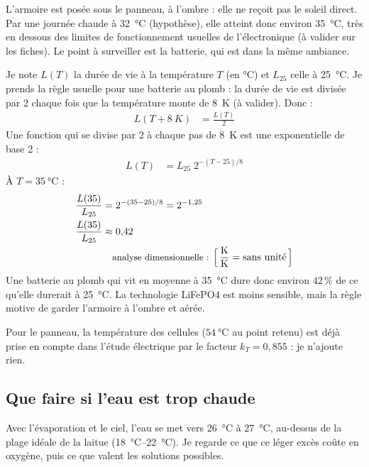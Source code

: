 L'armoire est posée sous le panneau, à l'ombre : elle ne reçoit pas le soleil direct. Par une journée chaude à \qty{32}{\celsius} (hypothèse), elle atteint donc environ \qty{35}{\celsius}, très en dessous des limites de fonctionnement usuelles de l'électronique (à valider sur les fiches). Le point à surveiller est la batterie, qui est dans la même ambiance.

\begin{demonstration}
Je note $L(T)$ la durée de vie à la température $T$ (en °C) et $L_{25}$ celle à \qty{25}{\celsius}. Je prends la règle usuelle pour une batterie au plomb : la durée de vie est divisée par 2 chaque fois que la température monte de \qty{8}{K} (à valider). Donc :
\begin{align*}
L(T + \qty{8}{K}) &= \frac{L(T)}{2}
\end{align*}
Une fonction qui se divise par 2 à chaque pas de \qty{8}{K} est une exponentielle de base 2 :
\begin{align*}
L(T) &= L_{25}\;2^{-(T - 25)/8}
\end{align*}
À $T = \qty{35}{\celsius}$ :
\begin{align*}
\frac{L(35)}{L_{25}} &= 2^{-(35-25)/8} = 2^{-1{,}25}\\
\frac{L(35)}{L_{25}} &\approx 0{,}42\\
\dimline{\dfrac{\unit{K}}{\unit{K}}=\text{sans unité}}
\end{align*}
Une batterie au plomb qui vit en moyenne à \qty{35}{\celsius} dure donc environ $42\,\%$ de ce qu'elle durerait à \qty{25}{\celsius}. La technologie LiFePO4 est moins sensible, mais la règle motive de garder l'armoire à l'ombre et aérée.
\end{demonstration}

Pour le panneau, la température des cellules ($\qty{54}{\celsius}$ au point retenu) est déjà prise en compte dans l'étude électrique par le facteur $k_T = 0{,}855$ : je n'ajoute rien.

\subsection{Que faire si l'eau est trop chaude}

Avec l'évaporation et le ciel, l'eau se met vers \qty{26}{\celsius} à \qty{27}{\celsius}, au-dessus de la plage idéale de la laitue (\qtyrange{18}{22}{\celsius}). Je regarde ce que ce léger excès coûte en oxygène, puis ce que valent les solutions possibles.

